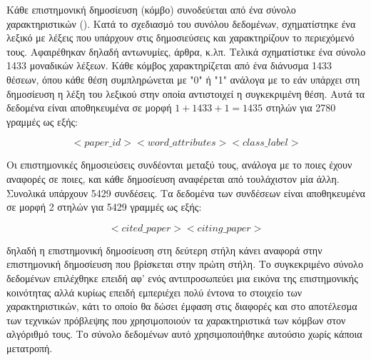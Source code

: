 Κάθε επιστημονική δημοσίευση (κόμβο) συνοδεύεται από ένα σύνολο χαρακτηριστικών (). Κατά το σχεδιασμό του συνόλου δεδομένων, σχηματίστηκε ένα λεξικό με λέξεις που
υπάρχουν στις δημοσιεύσεις και χαρακτηρίζουν το περιεχόμενό τους. Αφαιρέθηκαν δηλαδή αντωνυμίες,
άρθρα, κ.λπ. Τελικά σχηματίστικε ένα σύνολο 1433 μοναδικών λέξεων. Κάθε κόμβος χαρακτηρίζεται
από ένα διάνυσμα 1433 θέσεων, όπου κάθε θέση συμπληρώνεται με "0" ή "1" ανάλογα με το εάν
υπάρχει στη δημοσίευση η λέξη του λεξικού στην οποία αντιστοιχεί η συγκεκριμένη θέση. Αυτά 
τα δεδομένα είναι αποθηκευμένα σε μορφή \(1 + 1433 + 1 = 1435\) στηλών για 2780 γραμμές
ως εξής:

\begin{equation*}
    <paper\_id><word\_attributes><class\_label> 
\end{equation*}

Οι επιστημονικές δημοσιεύσεις συνδέονται μεταξύ τους, ανάλογα με το ποιες έχουν αναφορές σε
ποιες, και κάθε δημοσίευση αναφέρεται από τουλάχιστον μία άλλη. Συνολικά υπάρχουν 5429 
συνδέσεις. Τα δεδομένα των συνδέσεων είναι αποθηκευμένα σε μορφή 2 στηλών για 5429 γραμμές
ως εξής:

\begin{equation*}
    <cited\_paper><citing\_paper>
\end{equation*}

δηλαδή η επιστημονική δημοσίευση στη δεύτερη στήλη κάνει αναφορά στην επιστημονική δημοσίευση
που βρίσκεται στην πρώτη στήλη. Το συγκεκριμένο σύνολο δεδομένων επιλέχθηκε επειδή αφ' ενός 
αντιπροσωπεύει μια εικόνα της επιστημονικής κοινότητας αλλά κυρίως επειδή εμπεριέχει πολύ 
έντονα το στοιχείο των χαρακτηριστικών, κάτι το οποίο θα δώσει έμφαση στις διαφορές και στο 
αποτέλεσμα των τεχνικών πρόβλεψης που χρησιμοποιούν τα χαρακτηριστικά των κόμβων στον
αλγόριθμό τους. Το σύνολο δεδομένων αυτό χρησιμοποιήθηκε αυτούσιο χωρίς κάποια μετατροπή.

\subsection{} \label{BTCDataset}


